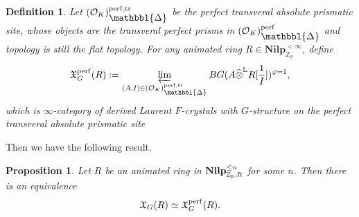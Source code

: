 \documentclass[10pt]{article}
\newtheorem{prop}[thm]{Proposition}
\newtheorem{dfn}[thm]{Definition}
\numberwithin{equation}{section}
\newcommand{\frakX}{{\mathfrak X}}
\newcommand{\bL}{{\mathbb L}}
\newcommand{\bZ}{{\mathbb Z}}
\newcommand{\calO}{{\mathcal O}}
\newcommand{\Prism}{{\mathlarger{\mathbbl{\Delta}}}} %
\begin{document}
\begin{dfn}
Let $(\calO_K)_{\Prism}^{\rm perf, tr}$ be the perfect transveral absolute prismatic site, whose objects are the transveral perfect prisms in $(\calO_K)_{\Prism}^{\rm perf}$ and topology is still the flat topology. For any animated ring $R\in \textbf{Nilp}^{<\infty}_{\bZ_p}$, define\[
    \frakX_G^{\rm perf}(R):=\varprojlim_{(A,I)\in (\calO_K)_{\Prism}^{\rm perf, tr}}BG(A\widehat\otimes^{\bL}R[\frac{1}{I}])^{\varphi=1},
    \]
    which is $\infty$-category of derived Laurent $F$-crystals with $G$-structure on the perfect transveral absolute prismatic site 
\end{dfn}
Then we have the following result.
\begin{prop}\label{perf-G}
      Let $R$ be an animated ring in $\textbf{Nilp}_{\bZ_p,\rm ft}^{\leq n}$ for some $n$. Then there is an equivalence 
      \[
      \frakX_G(R)\simeq \frakX_G^{\rm perf}(R).
      \]
\end{prop}
\end{document}
